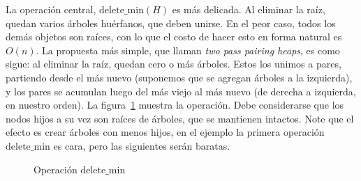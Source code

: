   La operación central,
  \(\mathrm{delete\_min}(H)\) es más delicada.
  Al eliminar la raíz,
  quedan varios árboles huérfanos,
  que deben unirse.
  En el peor caso,
  todos los demás objetos son raíces,
  con lo que el costo de hacer esto en forma natural es \(O(n)\).
  La propuesta más simple,
  que llaman \emph{\foreignlanguage{english}{two pass pairing heaps}},
  es como sigue:
  al eliminar la raíz,
  quedan cero o más árboles.
  Estos los unimos a pares,
  partiendo desde el más nuevo
  (suponemos que se agregan árboles a la izquierda),
  y los pares se acumulan luego del más viejo al más nuevo
  (de derecha a izquierda,
   en nuestro orden).
  La figura~\ref{fig:ph-delete-min} muestra la operación.
  Debe considerarse que los nodos hijos a su vez son raíces de árboles,
  que se mantienen intactos.
  Note que el efecto es crear árboles con menos hijos,
  en el ejemplo la primera operación \(\mathrm{delete\_min}\) es cara,
  pero las siguientes serán baratas.
  \begin{figure}[ht]
    \centering
    \hspace*{3.75em}
    \hspace*{3.75em}
    \caption{Operación \(\mathrm{delete\_min}\)}
    \label{fig:ph-delete-min}
  \end{figure}

